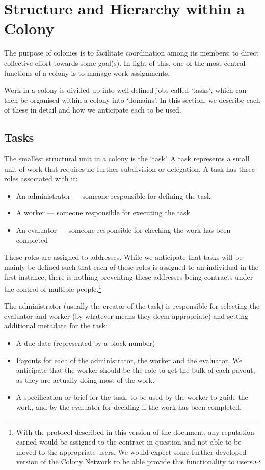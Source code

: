 \section{Structure and Hierarchy within a Colony}\label{sec:colony-structure}
The purpose of colonies is to facilitate coordination among its members; to direct collective effort towards some goal(s). In light of this, one of the most central functions of a colony is to manage work assignments.

Work in a colony is divided up into well-defined jobs called `tasks', which can then be organised within a colony into `domains'. In this section, we describe each of these in detail and how we anticipate each to be used.

\subsection{Tasks}\label{sec:tasks}

The smallest structural unit in a colony is the `task'. A task represents a small unit of work that requires no further subdivision or delegation. A task has three roles associated with it:
\begin{itemize}
\item An administrator --- someone responsible for defining the task
\item A worker --- someone responsible for executing the task
\item An evaluator --- someone responsible for checking the work has been completed
\end{itemize}

These roles are assigned to addresses. While we anticipate that tasks will be mainly be defined such that each of these roles is assigned to an individual in the first instance, there is nothing preventing these addresses being contracts under the control of multiple people.\footnote{With the protocol described in this version of the document, any reputation earned would be assigned to the contract in question and not able to be moved to the appropriate users. We would expect some further developed version of the Colony Network to be able provide this functionality to users.}

The administrator (usually the creator of the task) is responsible for selecting the evaluator and worker (by whatever means they deem appropriate) and setting additional metadata for the task:

\begin{itemize}
\item A due date (represented by a block number)
\item Payouts for each of the administrator, the worker and the evaluator. We anticipate that the worker should be the role to get the bulk of each payout, as they are actually doing most of the work. 
\item A specification or brief for the task, to be used by the worker to guide the work, and by the evaluator for deciding if the work has been completed.
\end{itemize}

